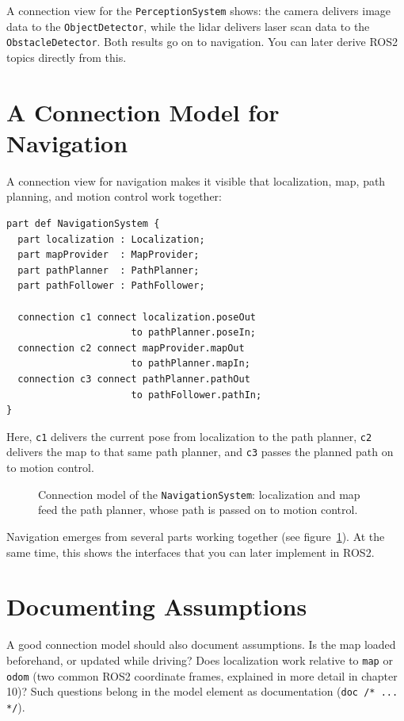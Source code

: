 \begin{praxisbox}
A connection view for the \texttt{PerceptionSystem} shows: the camera delivers image data to the \texttt{ObjectDetector}, while the lidar delivers laser scan data to the \texttt{ObstacleDetector}. Both results go on to navigation. You can later derive ROS2 topics directly from this.
\end{praxisbox}

\section{A Connection Model for Navigation}
A connection view for navigation makes it visible that localization, map, path planning, and motion control work together:

\begin{lstlisting}
part def NavigationSystem {
  part localization : Localization;
  part mapProvider  : MapProvider;
  part pathPlanner  : PathPlanner;
  part pathFollower : PathFollower;

  connection c1 connect localization.poseOut
                      to pathPlanner.poseIn;
  connection c2 connect mapProvider.mapOut
                      to pathPlanner.mapIn;
  connection c3 connect pathPlanner.pathOut
                      to pathFollower.pathIn;
}
\end{lstlisting}

Here, \texttt{c1} delivers the current pose from localization to the path planner, \texttt{c2} delivers the map to that same path planner, and \texttt{c3} passes the planned path on to motion control.

\begin{figure}[H]
  \centering
  \caption{Connection model of the \texttt{NavigationSystem}: localization and map feed the path planner, whose path is passed on to motion control.}
  \label{fig:kap09-verbindungsmodell-navigation}
\end{figure}

Navigation emerges from several parts working together (see figure~\ref{fig:kap09-verbindungsmodell-navigation}). At the same time, this shows the interfaces that you can later implement in ROS2.

\section{Documenting Assumptions}
A good connection model should also document assumptions. Is the map loaded beforehand, or updated while driving? Does localization work relative to \texttt{map} or \texttt{odom} (two common ROS2 coordinate frames, explained in more detail in chapter 10)? Such questions belong in the model element as documentation (\texttt{doc /* ... */}).


